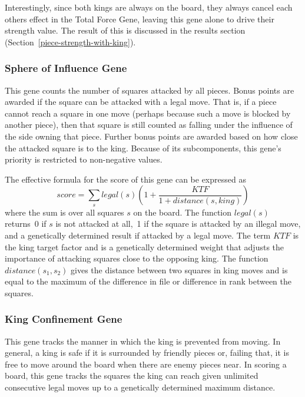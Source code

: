 \documentclass[letterpaper]{article}
\renewcommand{\_}{\allowbreak\textunderscore\allowbreak}
\begin{document}
Interestingly, since both kings are always on the board, they always cancel each others effect in the Total Force Gene, leaving this gene alone to drive their strength value. The result of this is discussed in the results section (Section~\ref{piece-strength-with-king}).

\subsubsection{Sphere of Influence Gene}
This gene counts the number of squares attacked by all pieces. Bonus points are awarded if the square can be attacked with a legal move. That is, if a piece cannot reach a square in one move (perhaps because such a move is blocked by another piece), then that square is still counted as falling under the influence of the side owning that piece. Further bonus points are awarded based on how close the attacked square is to the king. Because of its subcomponents, this gene's priority is restricted to non-negative values.

The effective formula for the score of this gene can be expressed as
\[score = \sum_s legal(s)\left(1+\frac{KTF}{1+distance(s,king)}\right)\]
where the sum is over all squares \(s\) on the board. The function \(legal(s)\) returns~0 if \(s\) is not attacked at all,~1 if the square is attacked by an illegal move, and a genetically determined result if attacked by a legal move. The term \(KTF\) is the king target factor and is a genetically determined weight that adjusts the importance of attacking squares close to the opposing king. The function \(distance(s_1, s_2)\) gives the distance between two squares in king moves and is equal to the maximum of the difference in file or difference in rank between the squares.

\subsubsection{King Confinement Gene}
This gene tracks the manner in which the king is prevented from moving. In general, a king is safe if it is surrounded by friendly pieces or, failing that, it is free to move around the board when there are enemy pieces near. In scoring a board, this gene tracks the squares the king can reach given unlimited consecutive legal moves up to a genetically determined maximum distance.
\end{document}
